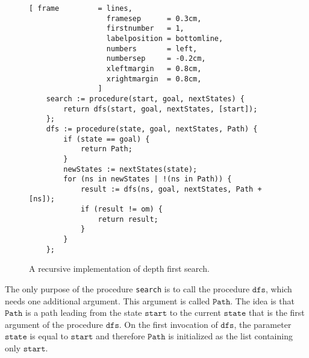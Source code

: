 \begin{figure}[!ht]
\centering
\begin{Verbatim}[ frame         = lines,
                  framesep      = 0.3cm,
                  firstnumber   = 1,
                  labelposition = bottomline,
                  numbers       = left,
                  numbersep     = -0.2cm,
                  xleftmargin   = 0.8cm,
                  xrightmargin  = 0.8cm,
                ]
    search := procedure(start, goal, nextStates) {
        return dfs(start, goal, nextStates, [start]);
    };
    dfs := procedure(state, goal, nextStates, Path) {
        if (state == goal) {
            return Path;
        }
        newStates := nextStates(state);
        for (ns in newStates | !(ns in Path)) {
            result := dfs(ns, goal, nextStates, Path + [ns]);
            if (result != om) {
                return result;
            }
        }
    };
\end{Verbatim}
\vspace*{-0.3cm}
\caption{A recursive implementation of depth first search.}
\label{fig:depth-first-search-recursive.stlx}
\end{figure}
The only purpose of the procedure \texttt{search} is to call the procedure $\mathtt{dfs}$, which needs one
additional argument.  This argument is called $\mathtt{Path}$.  The idea is that $\mathtt{Path}$ is
a path leading from the state $\mathtt{start}$ to the current $\mathtt{state}$ that is the first
argument of the procedure $\mathtt{dfs}$.  On the first invocation of $\mathtt{dfs}$, the
parameter $\mathtt{state}$ is equal to $\mathtt{start}$ and therefore $\mathtt{Path}$ is initialized
as the list containing only $\mathtt{start}$.

